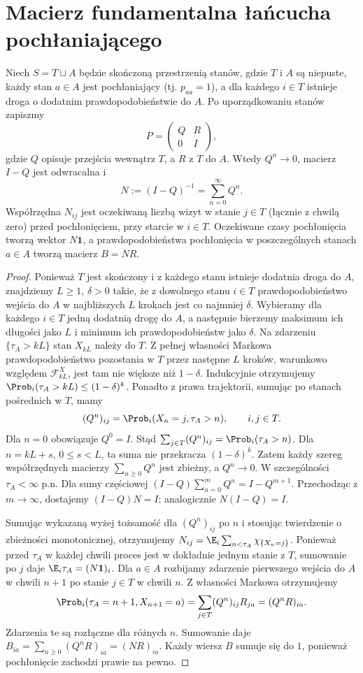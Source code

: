 \section{Macierz fundamentalna łańcucha pochłaniającego}

\begin{twierdzenie}
Niech $S=T\sqcup A$ będzie skończoną przestrzenią
stanów, gdzie $T$ i $A$ są niepuste, każdy stan
$a\in A$ jest pochłaniający (tj. $p_{aa}=1$),
a dla każdego $i\in T$ istnieje
droga o dodatnim prawdopodobieństwie do $A$.
Po uporządkowaniu stanów zapiszmy
\[
P=\begin{pmatrix}Q&R\\0&I\end{pmatrix},
\]
gdzie $Q$ opisuje przejścia wewnątrz $T$,
a $R$ z $T$ do $A$. Wtedy $Q^n\to0$, macierz
$I-Q$ jest odwracalna i
\[
N:=(I-Q)^{-1}=\sum_{n=0}^{\infty}Q^n.
\]
Współrzędna $N_{ij}$ jest oczekiwaną liczbą
wizyt w stanie $j\in T$ (łącznie z chwilą zero)
przed pochłonięciem, przy starcie w $i\in T$.
Oczekiwane czasy pochłonięcia tworzą wektor
$N\mathbf 1$, a prawdopodobieństwa pochłonięcia
w poszczególnych stanach $a\in A$ tworzą
macierz $B=NR$.
\end{twierdzenie}
\begin{proof}
Ponieważ $T$ jest skończony i z każdego stanu
istnieje dodatnia droga do $A$, znajdziemy
$L\geq1$, $\delta>0$ takie, że z dowolnego
stanu $i\in T$ prawdopodobieństwo wejścia do $A$
w najbliższych $L$ krokach jest co najmniej
$\delta$. Wybieramy dla każdego $i\in T$ jedną
dodatnią drogę do $A$, a następnie bierzemy
maksimum ich długości jako $L$ i minimum
ich prawdopodobieństw jako $\delta$.
Na zdarzeniu $\{\tau_A>kL\}$ stan $X_{kL}$
należy do $T$. Z pełnej własności Markowa
prawdopodobieństwo pozostania w $T$ przez
następne $L$ kroków, warunkowo względem
$\mathcal F_{kL}^X$, jest tam nie większe niż
$1-\delta$. Indukcyjnie otrzymujemy
$\Prob_i(\tau_A>kL)\leq(1-\delta)^k$.
Ponadto z prawa trajektorii, sumując po
stanach pośrednich w $T$, mamy
\[
(Q^n)_{ij}=\Prob_i(X_n=j,\tau_A>n),\qquad i,j\in T.
\]
Dla $n=0$ obowiązuje $Q^0=I$.
Stąd $\sum_{j\in T}(Q^n)_{ij}=\Prob_i(\tau_A>n)$.
Dla $n=kL+s$, $0\leq s<L$, ta suma nie przekracza
$(1-\delta)^k$. Zatem każdy szereg współrzędnych
macierzy $\sum_{n\geq0}Q^n$ jest zbieżny,
a $Q^n\to0$. W szczególności $\tau_A<\infty$ p.n.
Dla sumy częściowej
$(I-Q)\sum_{n=0}^{m}Q^n=I-Q^{m+1}$.
Przechodząc z $m\to\infty$, dostajemy
$(I-Q)N=I$; analogicznie $N(I-Q)=I$.

Sumując wykazaną wyżej tożsamość dla
$(Q^n)_{ij}$ po $n$ i stosując twierdzenie
o zbieżności monotonicznej, otrzymujemy
$N_{ij}=\E_i\sum_{n<\tau_A}\chi_{\{X_n=j\}}$.
Ponieważ przed $\tau_A$ w każdej chwili proces
jest w dokładnie jednym stanie z $T$, sumowanie
po $j$ daje $\E_i\tau_A=(N\mathbf 1)_i$.
Dla $a\in A$ rozbijamy zdarzenie pierwszego
wejścia do $A$ w chwili $n+1$ po stanie $j\in T$
w chwili $n$. Z własności Markowa otrzymujemy
\[
\Prob_i(\tau_A=n+1,X_{n+1}=a)
=\sum_{j\in T}(Q^n)_{ij}R_{ja}=(Q^nR)_{ia}.
\]
Zdarzenia te są rozłączne dla różnych $n$.
Sumowanie daje
$B_{ia}=\sum_{n\geq0}(Q^nR)_{ia}=(NR)_{ia}$.
Każdy wiersz $B$ sumuje się do $1$, ponieważ
pochłonięcie zachodzi prawie na pewno.
\end{proof}

